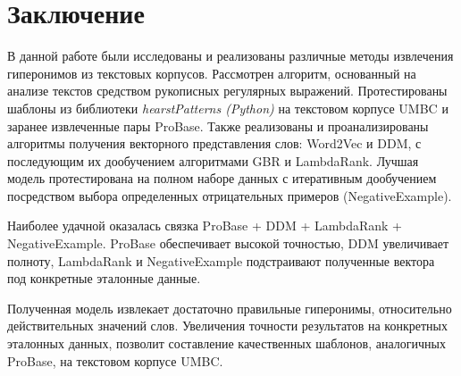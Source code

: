 \section*{Заключение}
\label{sec:Conclusion} 
\large

В данной работе были исследованы и реализованы различные методы извлечения гиперонимов из текстовых корпусов. Рассмотрен алгоритм, основанный на анализе текстов средством рукописных регулярных выражений. Протестированы шаблоны из библиотеки \textit{hearstPatterns (Python)} на текстовом корпусе UMBC и заранее извлеченные пары ProBase. Также реализованы и проанализированы алгоритмы получения векторного представления слов: Word2Vec и DDM, с последующим их дообучением алгоритмами GBR и LambdaRank. Лучшая модель протестирована на полном наборе данных с итеративным дообучением посредством выбора определенных отрицательных примеров (NegativeExample).

Наиболее удачной оказалась связка ProBase + DDM + LambdaRank + NegativeExample. ProBase обеспечивает высокой точностью, DDM увеличивает полноту, LambdaRank и NegativeExample подстраивают полученные вектора под конкретные эталонные данные. 

Полученная модель извлекает достаточно правильные гиперонимы, относительно действительных значений слов. Увеличения точности результатов на конкретных эталонных данных, позволит составление качественных шаблонов, аналогичных ProBase, на текстовом корпусе UMBC.